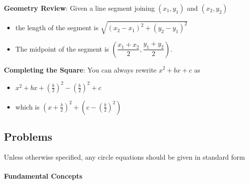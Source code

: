 \documentclass[
]{article}
\providecommand{\tightlist}{%
  \setlength{\itemsep}{0pt}\setlength{\parskip}{0pt}}
\def\tightlist{}
\begin{document}
\textbf{Geometry Review}: Given a line segment joining \((x_1,y_1)\) and
\((x_2,y_2)\)

\begin{itemize}
\tightlist
\item
  the length of the segment is \(\sqrt{(x_2-x_1)^2 + (y_2-y_1)^2}\)
\item
  The midpoint of the segment is
  \(\left(\dfrac{x_1+x_2}{2}, \dfrac{y_1+y_2}{2}\right).\)
\end{itemize}

\textbf{Completing the Square}: You can always rewrite \(x^2 + bx +c\)
as

\begin{itemize}
\tightlist
\item
  \(x^2 + bx +\left(\frac{b}{2}\right)^2 - \left(\frac{b}{2}\right)^2 +c\)
\item
  which is \((x+\frac{b}{2})^2 + (c - \left(\frac{b}{2}\right)^2)\)
\end{itemize}

\hypertarget{problems}{%
\subsection{Problems}\label{problems}}

Unless otherwise specified, any circle equations should be given in
standard form

\hypertarget{fundamental-concepts}{%
\paragraph{Fundamental Concepts}\label{fundamental-concepts}}
\end{document}
